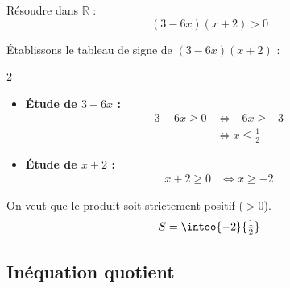 \begin{methode}
	Résoudre dans $\mathbb{R}$ :
	\[
		(3 - 6x)(x + 2) > 0
	\]

	\begin{correction}
		Établissons le tableau de signe de $(3 - 6x)(x + 2)$ :

		\begin{multicols}{2}
			\begin{itemize}
				\item \textbf{Étude de $3 - 6x$ :}
				      \[
					      \begin{aligned}
						      3 - 6x \ge 0 & \iff -6x \ge -3         \\
						                   & \iff x \le \tfrac{1}{2}
					      \end{aligned}
				      \]

				\item \textbf{Étude de $x + 2$ :}
				      \[
					      \begin{aligned}
						      x + 2 \ge 0 & \iff x \ge -2
					      \end{aligned}
				      \]
			\end{itemize}
		\end{multicols}
		\begin{center}
		\end{center}

		On veut que le produit soit strictement positif ($> 0$).
		\[
			S = \intoo{-2}{\tfrac{1}{2}}
		\]
	\end{correction}
\end{methode}

\subsection{Inéquation quotient}

